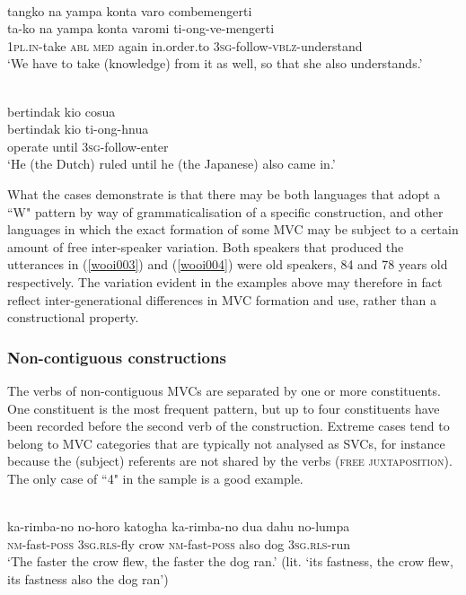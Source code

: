 \ea \label{wooi003}
\\
\glll tangko na yampa konta varo combemengerti \\
ta-ko na yampa konta varomi ti-ong-ve-mengerti \\
1\textsc{pl}.\textsc{in}-take \textsc{abl} \textsc{med} again in.order.to 3\textsc{sg}-follow-\textsc{vblz}-understand \\
\glft `We have to take (knowledge) from it as well, so that she also understands.'\\ 
\z

\ea \label{wooi004}
\\
\glll bertindak kio cosua \\
bertindak kio ti-ong-hnua \\
operate until 3\textsc{sg}-follow-enter \\
\glft `He (the Dutch) ruled until he (the Japanese) also came in.'\\ 
\z

What the  cases demonstrate is that there may be both languages that adopt a ``W" pattern by way of grammaticalisation of a specific construction, and other languages in which the exact formation of some MVC may be subject to a certain amount of free inter-speaker variation. Both  speakers that produced the utterances in (\ref{wooi003}) and (\ref{wooi004}) were old speakers, 84 and 78 years old respectively. The variation evident in the examples above may therefore in fact reflect inter-generational differences in MVC formation and use, rather than a constructional property.

\subsubsection{Non-contiguous constructions}

The verbs of non-contiguous MVCs are separated by one or more constituents. One constituent is the most frequent pattern, but up to four constituents have been recorded before the second verb of the construction. Extreme cases tend to belong to MVC categories that are typically not analysed as SVCs, for instance because the (subject) referents are not shared by the verbs (\textsc{free juxtaposition}). The only case of ``4" in the sample is a good example.

\ea \label{Muna047}
\\
\gll ka-rimba-no no-horo katogha ka-rimba-no dua dahu no-lumpa \\
\textsc{nm}-fast-\textsc{poss} 3\textsc{sg}.\textsc{rls}-fly crow \textsc{nm}-fast-\textsc{poss} also dog 3\textsc{sg}.\textsc{rls}-run \\
\glft `The faster the crow flew, the faster the dog ran.' (lit. `its fastness, the crow flew, its fastness also the dog ran')\\ 
\z

